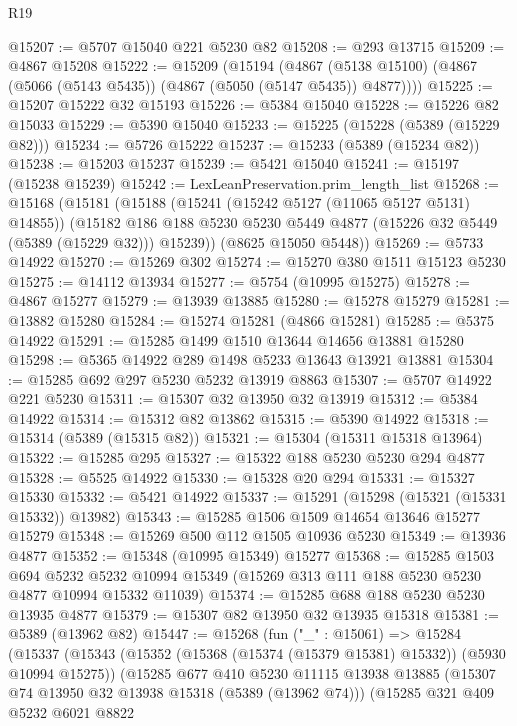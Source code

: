 \begin{lexlean}{R19}
\begin{coremodule}
@15207 := @5707 @15040 @221 @5230 @82
@15208 := @293 @13715
@15209 := @4867 @15208
@15222 := @15209
    (@15194
      (@4867 (@5138 @15100) (@4867 (@5066 (@5143 @5435)) (@4867 (@5050 (@5147 @5435)) @4877))))
@15225 := @15207 @15222 @32 @15193
@15226 := @5384 @15040
@15228 := @15226 @82 @15033
@15229 := @5390 @15040
@15233 := @15225 (@15228 (@5389 (@15229 @82)))
@15234 := @5726 @15222
@15237 := @15233 (@5389 (@15234 @82))
@15238 := @15203 @15237
@15239 := @5421 @15040
@15241 := @15197 (@15238 @15239)
@15242 := LexLeanPreservation.prim_length_list
@15268 := @15168
    (@15181
      (@15188
        (@15241 (@15242 @5127 (@11065 @5127 @5131) @14855))
        (@15182 @186 @188 @5230 @5230 @5449 @4877 (@15226 @32 @5449 (@5389 (@15229 @32))) @15239))
      (@8625 @15050 @5448))
@15269 := @5733 @14922
@15270 := @15269 @302
@15274 := @15270 @380 @1511 @15123 @5230
@15275 := @14112 @13934
@15277 := @5754 (@10995 @15275)
@15278 := @4867 @15277
@15279 := @13939 @13885
@15280 := @15278 @15279
@15281 := @13882 @15280
@15284 := @15274 @15281 (@4866 @15281)
@15285 := @5375 @14922
@15291 := @15285 @1499 @1510 @13644 @14656 @13881 @15280
@15298 := @5365 @14922 @289 @1498 @5233 @13643 @13921 @13881
@15304 := @15285 @692 @297 @5230 @5232 @13919 @8863
@15307 := @5707 @14922 @221 @5230
@15311 := @15307 @32 @13950 @32 @13919
@15312 := @5384 @14922
@15314 := @15312 @82 @13862
@15315 := @5390 @14922
@15318 := @15314 (@5389 (@15315 @82))
@15321 := @15304 (@15311 @15318 @13964)
@15322 := @15285 @295
@15327 := @15322 @188 @5230 @5230 @294 @4877
@15328 := @5525 @14922
@15330 := @15328 @20 @294
@15331 := @15327 @15330
@15332 := @5421 @14922
@15337 := @15291 (@15298 (@15321 (@15331 @15332)) @13982)
@15343 := @15285 @1506 @1509 @14654 @13646 @15277 @15279
@15348 := @15269 @500 @112 @1505 @10936 @5230
@15349 := @13936 @4877
@15352 := @15348 (@10995 @15349) @15277
@15368 := @15285
    @1503
    @694
    @5232
    @5232
    @10994
    @15349
    (@15269 @313 @111 @188 @5230 @5230 @4877 @10994 @15332 @11039)
@15374 := @15285 @688 @188 @5230 @5230 @13935 @4877
@15379 := @15307 @82 @13950 @32 @13935 @15318
@15381 := @5389 (@13962 @82)
@15447 := @15268
    (fun ("_" : @15061) =>
    @15284
      (@15337
        (@15343
          (@15352 (@15368 (@15374 (@15379 @15381) @15332)) (@5930 @10994 @15275))
          (@15285
            @677
            @410
            @5230
            @11115
            @13938
            @13885
            (@15307 @74 @13950 @32 @13938 @15318 (@5389 (@13962 @74)))
            (@15285
              @321
              @409
              @5232
              @6021
              @8822

\end{coremodule}
\end{lexlean}
